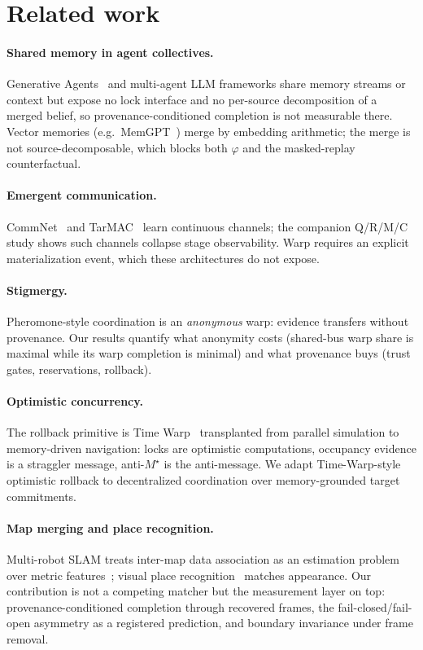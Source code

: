 \documentclass{article}
\newcommand{\mstar}{M^{\star}}
\begin{document}
\section{Related work}
\label{p2:sec:related}

\paragraph{Shared memory in agent collectives.} Generative
Agents~\cite{park2023generative} and multi-agent LLM frameworks share
memory streams or context but expose no lock interface and no
per-source decomposition of a merged belief, so provenance-conditioned
completion is not measurable there. Vector memories (e.g.\
MemGPT~\cite{packer2023memgpt}) merge by embedding arithmetic;
the merge is not source-decomposable, which blocks both $\varphi$ and
the masked-replay counterfactual.
\paragraph{Emergent communication.} CommNet~\cite{sukhbaatar2016commnet}
and TarMAC~\cite{das2019tarmac} learn continuous channels; the
companion Q/R/M/C study \citep{songlines1} shows such channels collapse stage observability. Warp
requires an explicit materialization event, which these architectures
do not expose.
\paragraph{Stigmergy.} Pheromone-style coordination is an
\emph{anonymous} warp: evidence transfers without provenance. Our
results quantify what anonymity costs (shared-bus warp share is
maximal while its warp completion is minimal) and what
provenance buys (trust gates, reservations, rollback).
\paragraph{Optimistic concurrency.} The rollback primitive is Time
Warp~\cite{jefferson1985} transplanted from parallel simulation to
memory-driven navigation: locks are optimistic computations,
occupancy evidence is a straggler message, anti-$\mstar$ is the
anti-message. We adapt Time-Warp-style optimistic rollback to
decentralized coordination over memory-grounded target commitments.


\label{p3:sec:related}

\paragraph{Map merging and place recognition.} Multi-robot SLAM
treats inter-map data association as an estimation problem over
metric features~\cite{cadena2016slam}; visual place
recognition~\cite{lowry2016vpr} matches appearance. Our contribution
is not a competing matcher but the measurement layer on top:
provenance-conditioned completion through recovered frames, the
fail-closed/fail-open asymmetry as a registered prediction, and
boundary invariance under frame removal.
\end{document}
